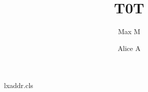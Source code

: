 \begin{filecontents*}[overwrite]{lxaddr.cls}
\def\address#1{\gdef\@address{#1}}
\def\email#1{\gdef\@email{#1}}
\let\@address\@empty
\renewcommand\maketitle{\par{\centering\@title\par\@author\par\@address\par\@email\par}}
\end{filecontents*}
\documentclass{lxaddr}
\address{Shared}

\title{T0}\author{Max M}\maketitle
Text.
\title{T}\author{Alice A}\maketitle
Body.

